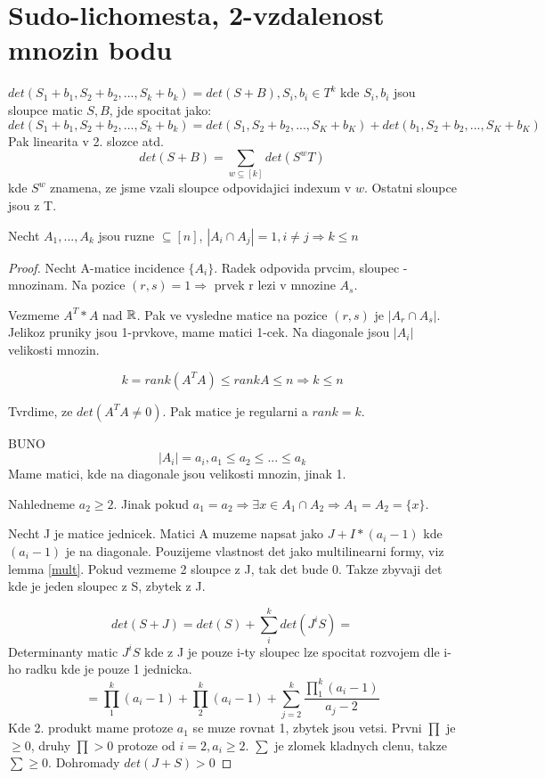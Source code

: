 \section{\texorpdfstring{Sudo-lichomesta, 2-vzdalenost mnozin bodu}{Sudo-lichomesta, 2-vzdalenost mnozin bodu}}
\vspace{5mm}
\large


\begin{lemma}\label{mult}
	$det(S_1 + b_1, S_2 + b_2 , ... , S_k + b_k) = det(S + B), S_i, b_i \in T^k$ kde $S_i,b_i$ jsou sloupce matic $S, B$, jde spocitat jako:
	\[ det(S_1 + b_1, S_2 + b_2 , ... , S_k + b_k) = det(S_1, S_2 + b_2 , ... , S_K + b_K) + det(b_1, S_2 + b_2 , ... , S_K + b_K) \]
	Pak linearita v 2. slozce atd.
	\[ det(S + B) = \sum_{w \subseteq [k]} det(S^wT) \]
	kde $S^w$ znamena, ze jsme vzali sloupce odpovidajici indexum v $w$. Ostatni sloupce jsou z T.
\end{lemma}


\begin{theorem}
	Necht $A_1, ... , A_k$ jsou ruzne $ \subseteq [n]$, $ |A_i \cap A_j| = 1, i \ne j \Rightarrow k \leq n$
\end{theorem}
\begin{proof}
	Necht A-matice incidence $\{A_i\}$. Radek odpovida prvcim, sloupec - mnozinam. Na pozice $(r,s) = 1 \Rightarrow$ prvek r lezi v mnozine $A_s$.

	Vezmeme $A^T * A$ nad $\operatorname{\mathbb{R}}$. Pak ve vysledne matice na pozice $(r,s)$ je $|A_r \cap A_s|$. Jelikoz pruniky jsou 1-prvkove, mame matici 1-cek. Na diagonale jsou $|A_i|$ velikosti mnozin.

	\[ k = rank(A^TA) \leq rank A \leq n \Rightarrow k \leq n \]

	Tvrdime, ze $det(A^TA \ne 0)$. Pak matice je regularni a $rank = k$.

	BUNO
	\[|A_i| = a_i, a_1 \leq a_2 \leq ... \leq a_k\]
	Mame matici, kde na diagonale jsou velikosti mnozin, jinak 1.

	Nahledneme $a_2 \geq 2$. Jinak pokud $a_1 = a_2 \Rightarrow \exists x \in A_1 \cap A_2 \Rightarrow A_1 = A_2 = \{ x \} $.

	Necht J je matice jednicek. Matici A muzeme napsat jako $J + I*(a_i - 1)$ kde $(a_i - 1)$ je na diagonale.
	Pouzijeme vlastnost det jako multilinearni formy, viz lemma \cref{mult}. Pokud vezmeme 2 sloupce z J, tak det bude 0. Takze zbyvaji det kde je jeden sloupec z S, zbytek z J.

	\[ det(S + J) = det(S) + \sum_i^k det(J^iS) = \]
	Determinanty matic $J^iS$ kde z J je pouze i-ty sloupec lze spocitat rozvojem dle i-ho radku kde je pouze 1 jednicka.
	\[ = \prod_1^k (a_i - 1) + \prod_2^k (a_i - 1) + \sum_{j=2}^k \frac{\prod_1^k (a_i - 1)}{a_j - 2} \]
	Kde 2. produkt mame protoze $a_1$ se muze rovnat 1, zbytek jsou vetsi. Prvni $\prod$ je $\geq 0$, druhy $\prod > 0$ protoze od $i = 2, a_i \geq 2$. $\sum$ je zlomek kladnych clenu, takze $\sum \geq 0$. Dohromady $ det(J + S) > 0$

\end{proof}

